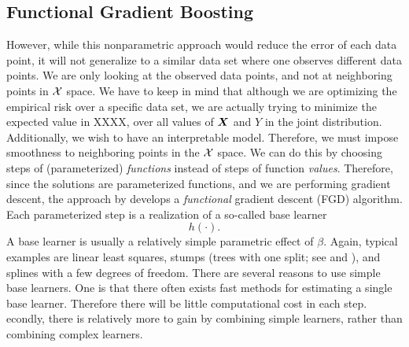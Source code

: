 \subsection{Functional Gradient Boosting}\label{sec:FGD}
However, while this nonparametric approach would reduce the error of each data point, it will not generalize to a similar data set where one observes different data points.
We are only looking at the observed data points, and not at neighboring points in $\mathcal{X}$ space.
We have to keep in mind that although we are optimizing the empirical risk over a specific data set,
we are actually trying to minimize the expected value in XXXX, over all values of $\bm{X}$ and $Y$ in the joint distribution.
Additionally, we wish to have an interpretable model.
Therefore, we must impose smoothness to neighboring points in the $\mathcal{X}$ space. We can do this by choosing steps of
(parameterized) \textit{functions} instead of steps of function \textit{values}.
Therefore, since the solutions are parameterized functions, and we are performing gradient descent,
the approach by \citet{friedman2001} develops a \textit{functional} gradient descent (FGD) algorithm.
Each parameterized step is a realization of a so-called base learner
\begin{equation}
    h(\cdot).
\end{equation}
A base learner is usually a relatively simple parametric effect of $\beta$.
Again, typical examples are linear least squares, stumps (trees with one split; see \citet{buhlmann2007} and \citet{ESL}), and splines with a few degrees of freedom.
There are several reasons to use simple base learners.
One is that there often exists fast methods for estimating a single base learner.
Therefore there will be little computational cost in each step. 
econdly, there is relatively more to gain by combining simple learners,
rather than combining complex learners.


